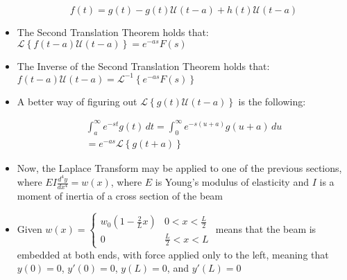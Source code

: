 \documentclass[12pt]{article}
\begin{document}
\begin{itemize}
        \begin{equation}
          f(t)=g(t)-g(t)\mathcal{U}(t-a)+h(t)\mathcal{U}(t-a)
          \label{4}
        \end{equation}

      \item The Second Translation Theorem holds that: $\mathcal{L}\left\{ f(t-a)\mathcal{U}(t-a) \right\}=e^{-as}F(s)$

      \item The Inverse of the Second Translation Theorem holds that: $f(t-a)\mathcal{U}(t-a)=\mathcal{L}^{-1}\left\{e^{-as}F(s)\right\}$

      \item A better way of figuring out $\mathcal{L}\left\{ g(t)\mathcal{U}(t-a) \right\}$ is the following:

        \begin{equation}
          \begin{split}
          \int_a^{\infty} e^{-st}g(t)\,dt=\int_0^{\infty} e^{-s(u+a)}g(u+a)\,du\\
          =e^{-as}\mathcal{L}\left\{ g(t+a)  \right\}
        \end{split}
          \label{5}
        \end{equation}

      \item Now, the Laplace Transform may be applied to one of the previous sections, where $EI\frac{d^4y}{dx^4}=w(x)$, where $E$ is Young's modulus of elasticity and $I$ is a moment of inertia of a cross section of the beam
        
      \item Given $w(x)=\left\{\begin{array}{ll} w_0\left( 1-\frac{2}{L}x \right) & 0<x<\frac{L}{2} \\ 0 & \frac{L}{2} < x < L \end{array}$ means that the beam is embedded at both ends, with force applied only to the left, meaning that $y(0)=0$, $y'(0)=0$, $y(L)=0$, and $y'(L)=0$

\end{itemize}
\end{document}
